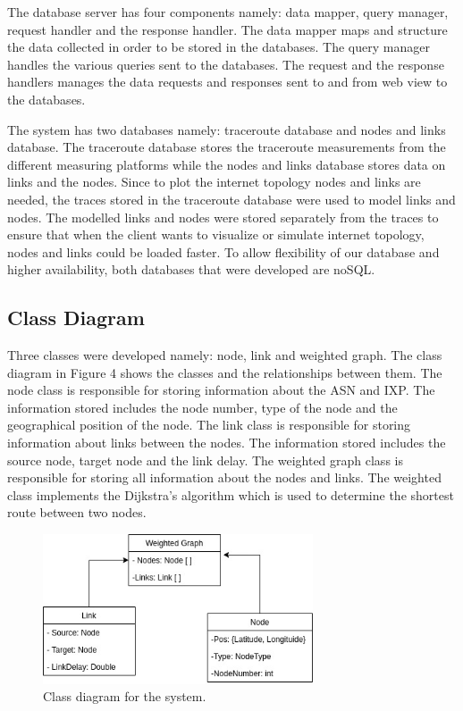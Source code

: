 The database server has four components namely: data mapper, query manager, request handler and the response handler. The data mapper maps and structure the data collected in order to be stored in the databases. The query manager handles the various queries sent to the databases. The request and the response handlers manages the data requests and responses sent to and from web view to the databases.

The system has two databases namely: traceroute database and nodes and links database. The traceroute database stores the traceroute measurements from the different measuring platforms while the nodes and links database stores data on links and the nodes. Since to plot the internet topology nodes and links are needed, the traces stored in the traceroute database were used to model links and nodes. The modelled links and nodes were stored separately from the traces to ensure that when the client wants to visualize or simulate internet topology, nodes and links could be loaded faster. To allow flexibility of our database and higher availability, both databases that were developed are noSQL.  

\subsection{Class Diagram}
Three classes were developed namely: node, link and weighted graph. The class diagram in Figure 4 shows the classes and the relationships between them. The node class is responsible for storing information about the ASN and IXP. The information stored includes the node number, type of the node and the geographical position of the node.  The link class is responsible for storing information about links between the nodes. The information stored includes the source node, target node and the link delay. The weighted graph class is responsible for storing all information about the nodes and links. The weighted class implements the Dijkstra's algorithm which is used to determine the shortest route between two nodes. 
\begin{figure}[htp]
   \centering
     \includegraphics[width=8cm]{sections/pictures-diagrams/class-diagram.jpg}
   \caption{Class diagram for the system.}
    \label{figure:galaxy}
\end{figure}


